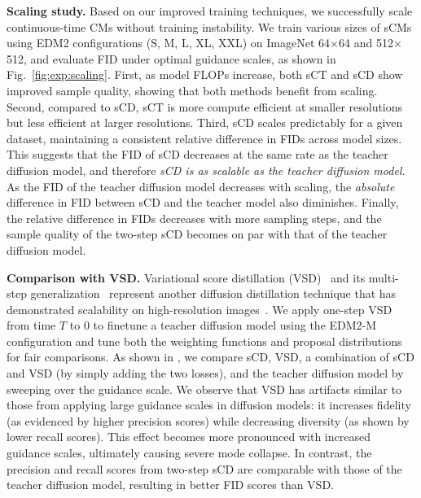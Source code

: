 \textbf{Scaling study. }
Based on our improved training techniques, we successfully scale continuous-time CMs without training instability. We train various sizes of sCMs using EDM2 configurations (S, M, L, XL, XXL) on ImageNet 64$\times$64 and 512$\times$512, and evaluate FID under optimal guidance scales, as shown in Fig.~\ref{fig:exp:scaling}.
First, as model FLOPs increase, both sCT and sCD show improved sample quality, showing that both methods benefit from scaling. Second, compared to sCD, sCT is more compute efficient at smaller resolutions but less efficient at larger resolutions. Third, sCD scales predictably for a given dataset, maintaining a consistent relative difference in FIDs across model sizes. This suggests that the FID of sCD decreases at the same rate as the teacher diffusion model, and therefore \emph{sCD is as scalable as the teacher diffusion model}. As the FID of the teacher diffusion model decreases with scaling, the \textit{absolute} difference in FID between sCD and the teacher model also diminishes. Finally, the relative difference in FIDs decreases with more sampling steps, and the sample quality of the two-step sCD becomes on par with that of the teacher diffusion model.

\textbf{Comparison with VSD. }
Variational score distillation (VSD)~\citep{wang2024prolificdreamer,yin2024dmd} and its multi-step generalization~\citep{xie2024EMD,salimans2024multistepmoment} represent another diffusion distillation technique that has demonstrated scalability on high-resolution images~\citep{yin2024dmd2}.
We apply one-step VSD from time $T$ to $0$ to finetune a teacher diffusion model using the EDM2-M configuration and tune both the weighting functions and proposal distributions for fair comparisons. As shown in , we compare sCD, VSD, a combination of sCD and VSD (by simply adding the two losses), and the teacher diffusion model by sweeping over the guidance scale. We observe that VSD has artifacts similar to those from applying large guidance scales in diffusion models: it increases fidelity (as evidenced by higher precision scores) while decreasing diversity (as shown by lower recall scores). This effect becomes more pronounced with increased guidance scales, ultimately causing severe mode collapse. In contrast, the precision and recall scores from two-step sCD are comparable with those of the teacher diffusion model, resulting in better FID scores than VSD.

